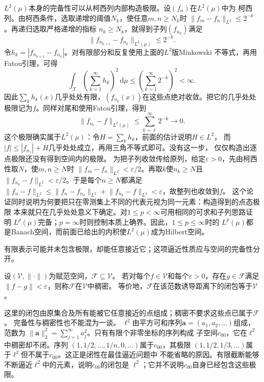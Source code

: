 $L^2(\mu)$本身的完备性可以从柯西列内部构造极限。设$(f_n)$在$L^2(\mu)$中为
柯西列。由柯西条件，选取递增的阈值$N_k$，使任意$m,n\geq N_k$时
$\lVert f_m-f_n\rVert_{L^2}\leq2^{-k}$。再递归选取严格递增的指标
$n_k\geq N_k$，就得到子列$(f_{n_k})$满足
\[
  \lVert f_{n_{k+1}}-f_{n_k}\rVert_{L^2(\mu)}
  \leq 2^{-k}.
\]
令$h_k=|f_{n_{k+1}}-f_{n_k}|$。对有限部分和反复使用上面的$L^2$版Minkowski
不等式，再用Fatou引理，可得
\[
  \int_{\mathcal{X}}
  \left(\sum_{k=1}^{\infty}h_k\right)^2
  \,\mathrm{d}\mu
  \leq
  \left(\sum_{k=1}^{\infty}2^{-k}\right)^2
  <\infty.
\]
因此$\sum_k h_k(x)$几乎处处有限，$(f_{n_k}(x))$在这些点绝对收敛。把它的几乎处处
极限记为$f$。同样对尾和使用Fatou引理，得到
\[
  \lVert f_{n_\ell}-f\rVert_{L^2(\mu)}
  \leq
  \sum_{k=\ell}^{\infty}2^{-k}
  \longrightarrow0.
\]
这个极限确实属于$L^2(\mu)$：令$H=\sum_k h_k$，前面的估计说明$H\in L^2$，
而$|f|\leq |f_{n_1}|+H$几乎处处成立，再用三角不等式即可。没有这一步，
仅仅构造出逐点极限还没有得到空间内的极限。
为把子列收敛传给原列，给定$\varepsilon>0$，先由柯西性取$N$，使$m,n\geq N$时
$\lVert f_m-f_n\rVert_{L^2}<\varepsilon/2$。再取$k$使$n_k\geq N$且
$\lVert f_{n_k}-f\rVert_{L^2}<\varepsilon/2$。于是每个$n\geq N$都满足
$\lVert f_n-f\rVert_{L^2}\leq\lVert f_n-f_{n_k}\rVert_{L^2}
+\lVert f_{n_k}-f\rVert_{L^2}<\varepsilon$，故整列也收敛到$f$。
这个论证同时说明为何要把只在零测集上不同的代表元视为同一元素：构造得到的点态极限
本来就只在几乎处处意义下确定。对$1\leq p<\infty$可用相同的可求和子列思路证明
$L^p(\mu)$完备；$p=\infty$时则控制本质上确界。因此，$1\leq p\leq\infty$时的
$L^p(\mu)$都是Banach空间，而前面已给出的内积使$L^2(\mu)$成为Hilbert空间。

有限表示可能并未包含极限，却能任意接近它；这项逼近性质应与空间的完备性分开。
\begin{definition}[稠密子集]
\label{def:functional-density}
设$(\mathcal V,\lVert\cdot\rVert)$为赋范空间，$\mathcal F\subseteq\mathcal V$。
若对每个$f\in\mathcal V$和每个$\varepsilon>0$，存在$g\in\mathcal F$满足
$\lVert f-g\rVert<\varepsilon$，则称$\mathcal F$在$\mathcal V$中稠密。
等价地，$\mathcal F$在该范数诱导距离下的闭包等于$\mathcal V$。
\end{definition}
这里的闭包由原集合及所有能被它任意接近的点组成；稠密不要求这些点已属于$\mathcal F$。
完备性与稠密性也不能混为一谈。
$\ell^2$由平方可和序列$\bm{a}=(a_1,a_2,\ldots)$组成，范数为
$\lVert\bm{a}\rVert_2^2=\sum_{j=1}^{\infty}a_j^2$。只有有限个非零坐标的序列构成
子空间$c_{00}$，它在$\ell^2$中稠密却不闭。序列
$(1,1/2,\ldots,1/n,0,\ldots)$属于$c_{00}$，其极限
$(1,1/2,1/3,\ldots)$属于$\ell^2$但不属于$c_{00}$。这正是闭性在最佳逼近问题中
不能省略的原因。有限截断能够不断逼近$\ell^2$中的元素，说明$c_{00}$的闭包是
$\ell^2$；它并不说明$c_{00}$自身已经包含这些极限。

